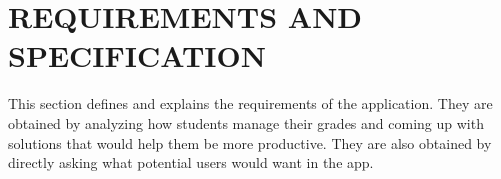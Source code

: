 \chapter{REQUIREMENTS AND SPECIFICATION}
\label{chap:requirements}


This section defines and explains the requirements of the application. They are obtained by analyzing how students manage their grades and coming up with solutions that would help them be more productive. They are also obtained by directly asking what potential users would want in the app.





